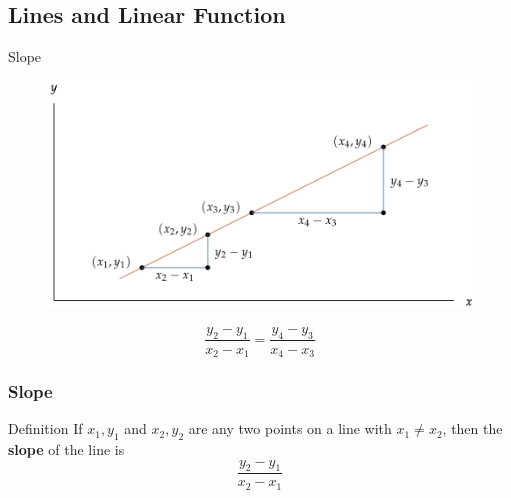 \documentclass{beamer}
\begin{document}
  \subsection{Lines and Linear Function}
  \begin{frame}{Slope}
    \begin{figure}
      \centering
      \includegraphics[scale=0.25]{slope.png}
    \end{figure}

    \[\frac{y_{2} - y_{1}}{x_{2} - x_{1}} = \frac{y_{4} - y_{3}}{x_{4} - x_{3}}\]
  \end{frame}
  \begin{frame}
    \frametitle{Slope}
    \begin{block}{Definition}
      If \(x_{1},y_{1}\) and \(x_{2},y_{2}\) are any two points on a line with \(x_{1} \neq x_{2}\), then the \textbf{slope}
      of the line is 
      \[\frac{y_{2} - y_{1}}{x_{2} - x_{1}}\] 
    \end{block}
  \end{frame}
\end{document}
